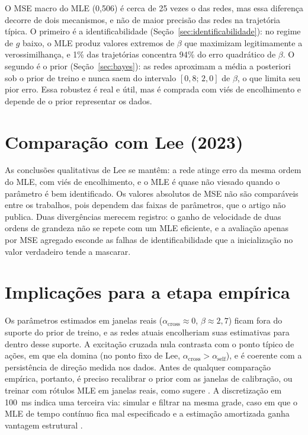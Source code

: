 \documentclass[12pt,a4paper,openany]{report}
\begin{document}
O MSE macro do MLE (0,506) é cerca de 25 vezes o das redes, mas essa diferença
decorre de dois mecanismos, e não de maior precisão das redes na trajetória típica.
O primeiro é a identificabilidade (Seção~\ref{sec:identificabilidade}): no regime de
\(g\) baixo, o MLE produz valores extremos de \(\beta\) que maximizam legitimamente a
verossimilhança, e 1\% das trajetórias concentra 94\% do erro quadrático de \(\beta\).
O segundo é o prior (Seção~\ref{sec:bayes}): as redes aproximam a média a posteriori
sob o prior de treino e nunca saem do intervalo \([0{,}8;\,2{,}0]\) de \(\beta\), o que
limita seu pior erro. Essa robustez é real e útil, mas é comprada com viés de
encolhimento e depende de o prior representar os dados.

\section{Comparação com Lee (2023)}

As conclusões qualitativas de Lee se mantêm: a rede atinge erro da mesma ordem do MLE,
com viés de encolhimento, e o MLE é quase não viesado quando o parâmetro é bem
identificado. Os valores absolutos de MSE não são comparáveis entre os trabalhos,
pois dependem das faixas de parâmetros, que o artigo não publica. Duas divergências
merecem registro: o ganho de velocidade de duas ordens de grandeza não se repete com
um MLE eficiente, e a avaliação apenas por MSE agregado esconde as falhas de
identificabilidade que a inicialização no valor verdadeiro tende a mascarar.

\section{Implicações para a etapa empírica}

Os parâmetros estimados em janelas reais (\(\alpha_{\mathrm{cross}}\approx0\),
\(\beta\approx2{,}7\)) ficam fora do suporte do prior de treino, e as redes atuais
encolheriam suas estimativas para dentro desse suporte. A excitação cruzada nula
contrasta com o ponto típico de ações, em que ela domina (no ponto fixo de Lee,
\(\alpha_{\mathrm{cross}}>\alpha_{\mathrm{self}}\)), e é coerente com a persistência
de direção medida nos dados. Antes de qualquer comparação empírica, portanto, é
preciso recalibrar o prior com as janelas de calibração, ou treinar com rótulos MLE
em janelas reais, como sugere \citet{lee2023}. A discretização em 100~ms indica uma
terceira via: simular e filtrar na mesma grade, caso em que o MLE de tempo contínuo
fica mal especificado e a estimação amortizada ganha vantagem estrutural
\citep{lambe2025}.
\end{document}

